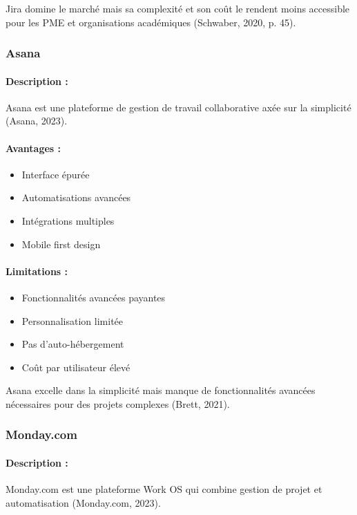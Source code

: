 Jira domine le marché mais sa complexité et son coût le rendent moins accessible pour les PME et organisations académiques (Schwaber, 2020, p. 45).

\subsubsection{Asana}
\paragraph{Description :} Asana est une plateforme de gestion de travail collaborative axée sur la simplicité (Asana, 2023).

\paragraph{Avantages :}
\begin{itemize}
    \item Interface épurée
    \item Automatisations avancées
    \item Intégrations multiples
    \item Mobile first design
\end{itemize}

\paragraph{Limitations :}
\begin{itemize}
    \item Fonctionnalités avancées payantes
    \item Personnalisation limitée
    \item Pas d'auto-hébergement
    \item Coût par utilisateur élevé
\end{itemize}

Asana excelle dans la simplicité mais manque de fonctionnalités avancées nécessaires pour des projets complexes (Brett, 2021).

\subsubsection{Monday.com}
\paragraph{Description :} Monday.com est une plateforme Work OS qui combine gestion de projet et automatisation (Monday.com, 2023).


